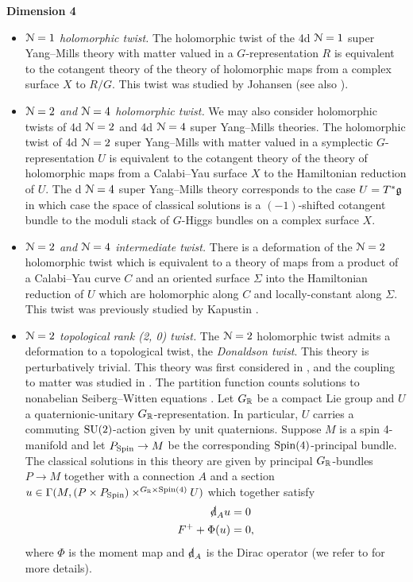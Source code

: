 \documentclass[10pt, oneside]{article}
\begin{document}
\textbf{Dimension 4}
\begin{itemize}
 \item \emph{$\mathcal{N}=1$ holomorphic twist.} The holomorphic twist of the 4d $\mathcal N=1$ super Yang--Mills theory with matter valued in a $G$-representation $R$ is equivalent to the cotangent theory of the theory of holomorphic maps from a complex surface $X$ to $R/G$. This twist was studied by Johansen \cite{Johansen} (see also \cite{BaulieuTanzini,CostelloSUSY}).
 \item \emph{$\mathcal N=2$ and $\mathcal N=4$ holomorphic twist.} We may also consider holomorphic twists of 4d $\mathcal N=2$ and 4d $\mathcal N=4$ super Yang--Mills theories. The holomorphic twist of 4d $\mathcal N=2$ super Yang--Mills with matter valued in a symplectic $G$-representation $U$ is equivalent to the cotangent theory of the theory of holomorphic maps from a Calabi--Yau surface $X$ to the Hamiltonian reduction of $U$. The d $\mathcal N=4$ super Yang--Mills theory corresponds to the case $U=T^*\mathfrak g$ in which case the space of classical solutions is a $(-1)$-shifted cotangent bundle to the moduli stack of $G$-Higgs bundles on a complex surface $X$.
 \item \emph{$\mathcal{N}=2$ and $\mathcal{N}=4$ intermediate twist.} There is a deformation of the $\mathcal N=2$ holomorphic twist which is equivalent to a theory of maps from a product of a Calabi--Yau curve $C$ and an oriented surface $\Sigma$ into the Hamiltonian reduction of $U$ which are holomorphic along $C$ and locally-constant along $\Sigma$. This twist was previously studied by Kapustin \cite{KapustinHolo}.
 \item \emph{$\mathcal{N}=2$ topological rank (2, 0) twist.} The $\mathcal N=2$ holomorphic twist admits a deformation to a topological twist, the \emph{Donaldson twist}. This theory is perturbatively trivial. This theory was first considered in \cite{WittenTQFT}, and the coupling to matter was studied in \cite{AnselmiFre, AlvarezLabastida, HyunParkPark}. The partition function counts solutions to nonabelian Seiberg--Witten equations \cite{Pidstrigach}. Let $G_\mathbb R$ be a compact Lie group and $U$ a quaternionic-unitary $G_\mathbb R$-representation. In particular, $U$ carries a commuting $\mathrm{SU}(2)$-action given by unit quaternions. Suppose $M$ is a spin 4-manifold and let $P_{\mathrm{Spin}}\rightarrow M$ be the corresponding $\mathrm{Spin}(4)$-principal bundle. The classical solutions in this theory are given by principal $G_\mathbb R$-bundles $P\rightarrow M$ together with a connection $A$ and a section $u\in\Gamma(M, (P\times P_{\mathrm{Spin}})\times^{G_\mathbb R\times \mathrm{Spin}(4)} U)$ which together satisfy
\begin{align}
\sd \d_A u &= 0 \label{eq:SW1} \\
F^+ + \Phi(u) &= 0, \label{eq:SW2}
\end{align}
where $\Phi$ is the moment map and $\sd\d_A$ is the Dirac operator (we refer to \cite{Pidstrigach,HaydysDirac} for more details).


\end{itemize}
\end{document}
